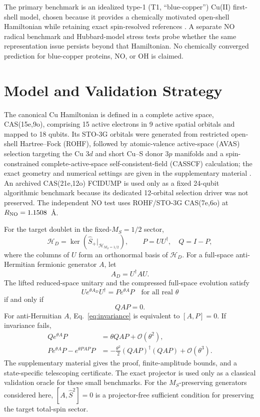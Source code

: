 \documentclass[
 aip,
 jcp,
 amsmath,amssymb,
 preprint
]{revtex4-2}
\begin{document}
The primary benchmark is an idealized type-1 (T1, ``blue-copper'') Cu(II) first-shell model, chosen because it provides a chemically motivated open-shell Hamiltonian while retaining exact spin-resolved references \cite{solomon2004bluecopper,solomon2014copper}.
A separate NO radical benchmark and Hubbard-model stress tests probe whether the same representation issue persists beyond that Hamiltonian.
No chemically converged prediction for blue-copper proteins, NO, or OH is claimed.

\section{Model and Validation Strategy}

The canonical Cu Hamiltonian is defined in a complete active space, CAS(15e,9o), comprising 15 active electrons in 9 active spatial orbitals and mapped to 18 qubits.
Its STO-3G orbitals were generated from restricted open-shell Hartree--Fock (ROHF), followed by atomic-valence active-space (AVAS) selection targeting the Cu $3d$ and short Cu--S donor $3p$ manifolds and a spin-constrained complete-active-space self-consistent-field (CASSCF) calculation; the exact geometry and numerical settings are given in the supplementary material \cite{sun2018pyscf,sayfutyarova2017avas}.
An archived CAS(21e,12o) FCIDUMP is used only as a fixed 24-qubit algorithmic benchmark because its dedicated 12-orbital selection driver was not preserved.
The independent NO test uses ROHF/STO-3G CAS(7e,6o) at $R_{\rm NO}=1.1508$~\AA{}.

For the target doublet in the fixed-$M_S=1/2$ sector,
\begin{equation}
\mathcal H_D=\ker\!\left(\hat S_+\big|_{\mathcal H_{M_S=1/2}}\right),
\qquad
P=UU^\dagger,\quad Q=I-P,
\end{equation}
where the columns of $U$ form an orthonormal basis of $\mathcal H_D$.
For a full-space anti-Hermitian fermionic generator $A$, let
\begin{equation}
A_D=U^\dagger A U.
\end{equation}
The lifted reduced-space unitary and the compressed full-space evolution satisfy
\begin{equation}
Ue^{\theta A_D}U^\dagger
=
Pe^{\theta A}P
\quad\text{for all real }\theta
\end{equation}
if and only if
\begin{equation}
QAP=0.
\label{eq:invariance}
\end{equation}
For anti-Hermitian $A$, Eq.~\ref{eq:invariance} is equivalent to $[A,P]=0$.
If invariance fails,
\begin{align}
Qe^{\theta A}P&=\theta QAP+\mathcal O(\theta^2),\\
Pe^{\theta A}P-e^{\theta PAP}P
&=
-\frac{\theta^2}{2}(QAP)^\dagger(QAP)+\mathcal O(\theta^3).
\end{align}
The supplementary material gives the proof, finite-amplitude bounds, and a state-specific telescoping certificate.
The exact projector is used only as a classical validation oracle for these small benchmarks. For the $M_S$-preserving generators considered here, $[A,\hat S^2]=0$ is a projector-free sufficient condition for preserving the target total-spin sector.
\end{document}
